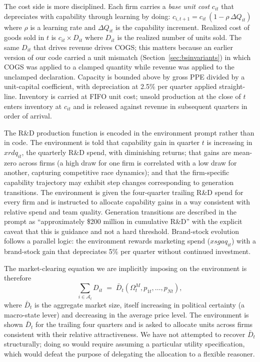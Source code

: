 \documentclass[11pt]{article}
\begin{document}
The cost side is more disciplined. Each firm carries a
\textit{base unit cost} $c_{it}$ that depreciates with capability
through learning by doing: $c_{i,t+1} = c_{it}\,(1 - \rho \, \Delta Q_{it})$
where $\rho$ is a learning rate and $\Delta Q_{it}$ is the
capability increment. Realized cost of goods sold in $t$ is
$c_{it} \times D_{it}$ where $D_{it}$ is the realized number of units
sold. The same $D_{it}$ that drives revenue drives COGS; this matters
because an earlier version of our code carried a unit mismatch
(Section~\ref{sec:bsinvariants}) in which COGS was applied to a
clamped quantity while revenue was applied to the unclamped
declaration. Capacity is bounded above by gross PPE divided by a
unit-capital coefficient, with depreciation at 2.5\% per quarter
applied straight-line. Inventory is carried at FIFO unit cost; unsold
production at the close of $t$ enters inventory at $c_{it}$ and is
released against revenue in subsequent quarters in order of arrival.

The R\&D production function is encoded in the environment prompt
rather than in code. The environment is told that capability gain in
quarter $t$ is increasing in $\mathit{xrdq}_{it}$, the quarterly R\&D spend, with
diminishing returns; that gains are mean-zero across firms (a high
draw for one firm is correlated with a low draw for another, capturing
competitive race dynamics); and that the firm-specific capability
trajectory may exhibit step changes corresponding to generation
transitions. The environment is given the four-quarter trailing R\&D
spend for every firm and is instructed to allocate capability gains in
a way consistent with relative spend and team quality. Generation
transitions are described in the prompt as ``approximately
\$200 million in cumulative R\&D'' with the explicit caveat that this
is guidance and not a hard threshold. Brand-stock evolution follows a
parallel logic: the environment rewards marketing spend ($\mathit{xsgaq}_{it}$)
with a brand-stock gain that depreciates 5\% per quarter without
continued investment.

The market-clearing equation we are implicitly imposing on the
environment is therefore
\[
\sum_{i \in \mathcal{A}_t} D_{it} \;=\; \bar{D}_t(\Omega_t^M, p_{1t}, \ldots, p_{Nt}),
\]
where $\bar{D}_t$ is the aggregate market size, itself increasing in
political certainty (a macro-state lever) and decreasing in the
average price level. The environment is shown $\bar{D}_t$ for the
trailing four quarters and is asked to allocate units across firms
consistent with their relative attractiveness. We have not attempted
to recover $\bar{D}_t$ structurally; doing so would require assuming a
particular utility specification, which would defeat the purpose of
delegating the allocation to a flexible reasoner.
\end{document}
